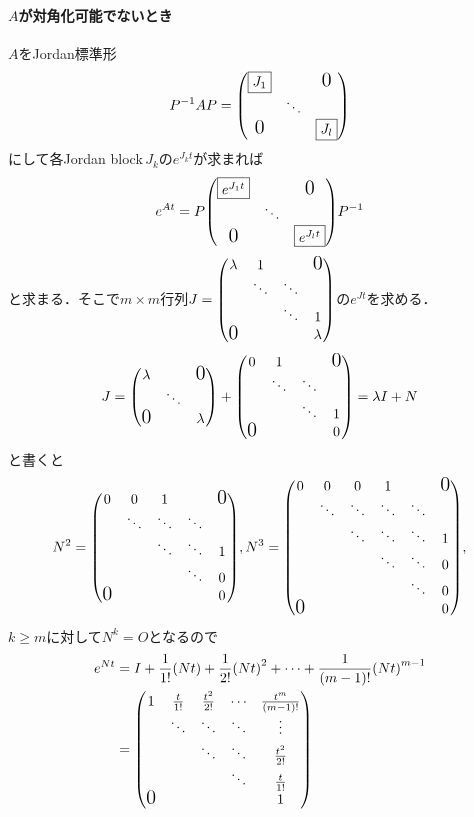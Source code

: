 \documentclass[autodetect-engine,dvipdfmx-if-dvi,ja=standard]{bxjsarticle}
\theoremstyle{mystyle1}
\theoremstyle{mystyle2}
\newcommand{\Largezero}{\ensuremath{\text{\Large{0}}}}
\begin{document}
\paragraph{$A$が対角化可能でないとき}
$A$をJordan標準形
\[P^{-1}AP=\mqty(
  \text{\fbox{$J_1$}}&&\Largezero\\
  &\ddots&\\
  \Largezero&&\text{\fbox{$J_l$}}
  )\]
にして各Jordan block\,$J_k$の$e^{J_kt}$が求まれば
\[e^{At}=P\mqty(
  \text{\fbox{$e^{J_1t}$}}&&\Largezero\\
  &\ddots&\\
  \Largezero&&\text{\fbox{$e^{J_lt}$}}
  )P^{-1}\]
と求まる．そこで$m\times m$行列$J=\mqty(
  \lambda&1&&\Largezero\\
  &\ddots&\ddots&\\
  &&\ddots&1\\
  \Largezero&&&\lambda
  )$の$e^{Jt}$を求める．
\[J=\mqty(
  \lambda&&\Largezero\\
  &\ddots&\\
  \Largezero&&\lambda
  )+\mqty(
  0&1&&\Largezero\\
  &\ddots&\ddots&\\
  &&\ddots&1\\
  \Largezero&&&0
  )=\lambda I+N\]
と書くと
\[N^2=\mqty(
  0&0&1&&\Largezero\\
  &\ddots&\ddots&\ddots&\\
  &&\ddots&\ddots&1\\
  &&&\ddots&0\\
  \Largezero&&&&0
  ),N^3=\mqty(
  0&0&0&1&&\Largezero\\
  &\ddots&\ddots&\ddots&\ddots&\\
  &&\ddots&\ddots&\ddots&1\\
  &&&\ddots&\ddots&0\\
  &&&&\ddots&0\\
  \Largezero&&&&&0
  ),\]$k\geq m$に対して$N^k=O$となるので
\begin{align*}
  e^{Nt}
             & =I+\frac{1}{1!}\qty(Nt)+\frac{1}{2!}\qty(Nt)^2+\cdots+\frac{1}{\qty(m-1)!}\qty(Nt)^{m-1}                                                    \\
             & =\mqty(
  1          & \frac{t}{1!}                                                                             & \frac{t^2}{2!} & \cdots & \frac{t^m}{\qty(m-1)!} \\
             & \ddots                                                                                   & \ddots         & \ddots & \vdots                 \\
             &                                                                                          & \ddots         & \ddots & \frac{t^2}{2!}         \\
             &                                                                                          &                & \ddots & \frac{t}{1!}           \\
  \Largezero &                                                                                          &                &        & 1
  )
\end{align*}
\end{document}

